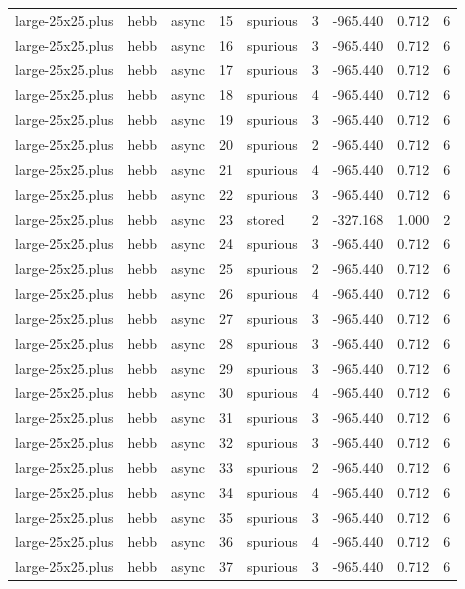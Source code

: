 \begin{tabular}{lllrlrrrr}
large-25x25.plus & hebb & async & 15 & spurious & 3 & -965.440 & 0.712 & 6 \\
large-25x25.plus & hebb & async & 16 & spurious & 3 & -965.440 & 0.712 & 6 \\
large-25x25.plus & hebb & async & 17 & spurious & 3 & -965.440 & 0.712 & 6 \\
large-25x25.plus & hebb & async & 18 & spurious & 4 & -965.440 & 0.712 & 6 \\
large-25x25.plus & hebb & async & 19 & spurious & 3 & -965.440 & 0.712 & 6 \\
large-25x25.plus & hebb & async & 20 & spurious & 2 & -965.440 & 0.712 & 6 \\
large-25x25.plus & hebb & async & 21 & spurious & 4 & -965.440 & 0.712 & 6 \\
large-25x25.plus & hebb & async & 22 & spurious & 3 & -965.440 & 0.712 & 6 \\
large-25x25.plus & hebb & async & 23 & stored & 2 & -327.168 & 1.000 & 2 \\
large-25x25.plus & hebb & async & 24 & spurious & 3 & -965.440 & 0.712 & 6 \\
large-25x25.plus & hebb & async & 25 & spurious & 2 & -965.440 & 0.712 & 6 \\
large-25x25.plus & hebb & async & 26 & spurious & 4 & -965.440 & 0.712 & 6 \\
large-25x25.plus & hebb & async & 27 & spurious & 3 & -965.440 & 0.712 & 6 \\
large-25x25.plus & hebb & async & 28 & spurious & 3 & -965.440 & 0.712 & 6 \\
large-25x25.plus & hebb & async & 29 & spurious & 3 & -965.440 & 0.712 & 6 \\
large-25x25.plus & hebb & async & 30 & spurious & 4 & -965.440 & 0.712 & 6 \\
large-25x25.plus & hebb & async & 31 & spurious & 3 & -965.440 & 0.712 & 6 \\
large-25x25.plus & hebb & async & 32 & spurious & 3 & -965.440 & 0.712 & 6 \\
large-25x25.plus & hebb & async & 33 & spurious & 2 & -965.440 & 0.712 & 6 \\
large-25x25.plus & hebb & async & 34 & spurious & 4 & -965.440 & 0.712 & 6 \\
large-25x25.plus & hebb & async & 35 & spurious & 3 & -965.440 & 0.712 & 6 \\
large-25x25.plus & hebb & async & 36 & spurious & 4 & -965.440 & 0.712 & 6 \\
large-25x25.plus & hebb & async & 37 & spurious & 3 & -965.440 & 0.712 & 6 \\

\end{tabular}
